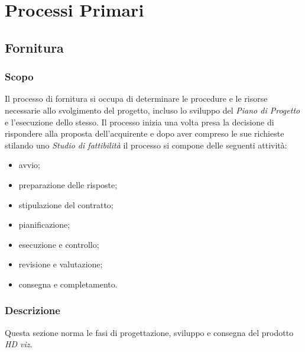 \section{Processi Primari}
	\subsection{Fornitura}
		\subsubsection{Scopo}
		Il processo di fornitura si occupa di determinare le procedure e le risorse necessarie allo svolgimento del progetto, incluso lo sviluppo del \textit{Piano di Progetto} e l'esecuzione dello stesso. Il processo inizia una volta presa la decisione di rispondere alla proposta dell'acquirente e dopo aver compreso le sue richieste stilando uno \textit{Studio di fattibilità} il processo si compone delle seguenti attività:
		\begin{itemize}
		    \item avvio;
		    \item preparazione delle risposte;
		    \item stipulazione del contratto;
		    \item pianificazione;
		    \item esecuzione e controllo;
		    \item revisione e valutazione;
		    \item consegna e completamento.
		\end{itemize}
		\subsubsection{Descrizione}
		Questa sezione norma le fasi di progettazione, sviluppo e consegna del prodotto \textit{HD viz}. 
